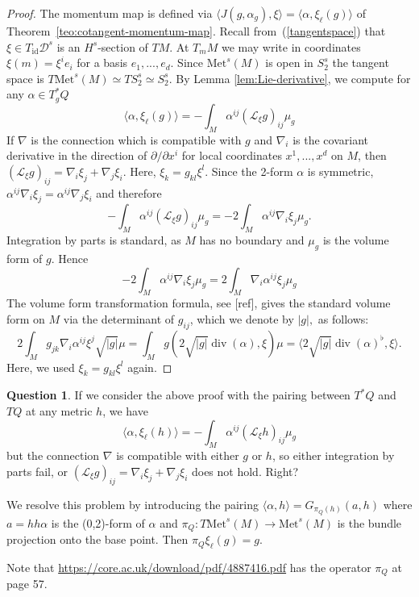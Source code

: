 \documentclass[a5paper,10pt,twoside]{article}
\newcommand{\cL}{\ensuremath{\mathcal{L}}}
\newcommand{\cD}{\ensuremath{\mathcal{D}}}
\newcommand{\Met}{\ensuremath{\mathrm{Met}}}
\DeclareMathOperator*{\Div}{div}
\DeclareMathOperator*{\id}{id}
\theoremstyle{plain}
\theoremstyle{definition}
\newtheorem{question}{Question}
\theoremstyle{remark}
\begin{document}
\begin{proof}
The momentum map is defined via $\langle J(g,\alpha_g),\xi\rangle = \langle \alpha, \xi_\ell(g)\rangle $ of Theorem~\ref{teo:cotangent-momentum-map}. Recall from~(\ref{tangentspace}) that $\xi\in T_{\id}\cD^s$ is an $H^s$-section of $TM$. At $T_mM$ we may write  in coordinates  $\xi(m)=\xi^ie_i$ for a basis $e_1,...,e_d$. Since $\Met^s(M)$ is open in $S_2^s$ the tangent space is $T\Met^s(M)\simeq TS_2^s\simeq S_2^s.$ By Lemma \ref{lem:Lie-derivative}, we compute for any $\alpha\in T^*_gQ$
%
\begin{equation}
\langle \alpha,\xi_\ell(g)\rangle = -\int_M \alpha^{ij}(\cL_\xi g)_{ij}\mu_g
\end{equation}
%
If $\nabla$ is the connection which is compatible with $g$ and $\nabla_{i}$
is the covariant derivative in the direction of $\partial/\partial x^{i}$
for local coordinates $x^{1},...,x^{d}$ on $M$, then $(\cL_{\xi}g)_{ij}=\nabla_{i}\xi_{j}+\nabla_{j}\xi_{i}.$
Here, $\xi_{k}=g_{kl}\xi^{l}.$ Since the 2-form $\alpha$ is symmetric,
$\alpha^{ij}\nabla_{i}\xi_{j}=\alpha^{ij}\nabla_{j}\xi_{i}$ and therefore
\[
-\int_{M}\alpha^{ij}(\cL_{\xi}g)_{ij}\mu_{g}=-2\int_{M}\alpha^{ij}\nabla_{i}\xi_{j}\mu_{g}.
\]
Integration by parts is standard, as $M$ has no boundary and $\mu_g$ is the volume form of $g$. Hence
%
\begin{equation}
-2\int_{M}\alpha^{ij}\nabla_{i}\xi_{j}\mu_{g}= 2\int_{M}\nabla_{i}\alpha^{ij}\xi_{j}\mu_{g}
\end{equation} 
%
The volume form transformation formula, see [ref], gives the standard volume form on $M$ via the determinant of $g_{ij}$, which we denote by $|g|,$ as follows:
%
\begin{equation}
2\int_{M}g_{jk}\nabla_{i}\alpha^{ij}\xi^{j} \sqrt{|g|}\mu=\int_Mg(2\sqrt{|g|}\Div(\alpha),\xi)\mu=\langle 2\sqrt{|g|}\Div(\alpha)^\flat,\xi\rangle.
\end{equation}
%
Here, we used $\xi_{k}=g_{kl}\xi^{l}$ again.
\end{proof}

\begin{question}
If we consider the above proof with the pairing between $T^*Q$ and $T Q$ at any metric $h$, we have
%
\begin{equation}
\langle \alpha,\xi_\ell(h)\rangle = -\int_M \alpha^{ij}(\cL_\xi h)_{ij}\mu_g
\end{equation}
%
but the connection $\nabla$ is compatible with either $g$ or $h$, so either integration by parts fail, or $(\cL_{\xi}g)_{ij}=\nabla_{i}\xi_{j}+\nabla_{j}\xi_{i}$ does not hold. Right?

We resolve this problem by introducing the pairing $\langle \alpha,h\rangle=G_{\pi_Q(h)}(a,h)$ where $a=hh\alpha$ is the (0,2)-form of $\alpha$ and $\pi_Q:T\Met^s(M)\to\Met^s(M)$ is the bundle projection onto the base point. Then $\pi_Q\xi_\ell(g)=g.$ 

Note that \url{https://core.ac.uk/download/pdf/4887416.pdf} has 
the operator $\pi_Q$ at page 57.
\end{question}
\end{document}
